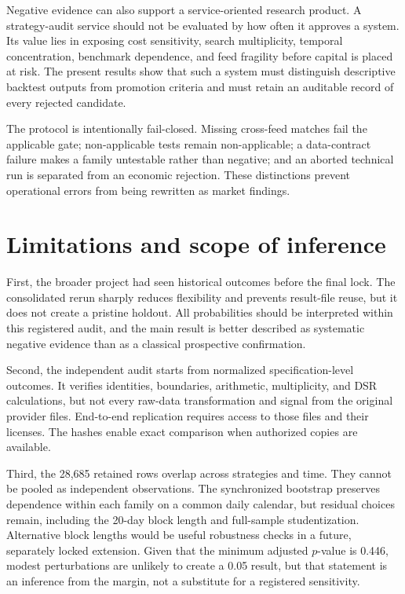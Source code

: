 Negative evidence can also support a service-oriented research product. A strategy-audit service should not be evaluated by how often it approves a system. Its value lies in exposing cost sensitivity, search multiplicity, temporal concentration, benchmark dependence, and feed fragility before capital is placed at risk. The present results show that such a system must distinguish descriptive backtest outputs from promotion criteria and must retain an auditable record of every rejected candidate.

The protocol is intentionally fail-closed. Missing cross-feed matches fail the applicable gate; non-applicable tests remain non-applicable; a data-contract failure makes a family untestable rather than negative; and an aborted technical run is separated from an economic rejection. These distinctions prevent operational errors from being rewritten as market findings.

\section{Limitations and scope of inference}\label{sec:limitations}

First, the broader project had seen historical outcomes before the final lock. The consolidated rerun sharply reduces flexibility and prevents result-file reuse, but it does not create a pristine holdout. All probabilities should be interpreted within this registered audit, and the main result is better described as systematic negative evidence than as a classical prospective confirmation.

Second, the independent audit starts from normalized specification-level outcomes. It verifies identities, boundaries, arithmetic, multiplicity, and DSR calculations, but not every raw-data transformation and signal from the original provider files. End-to-end replication requires access to those files and their licenses. The hashes enable exact comparison when authorized copies are available.

Third, the 28,685 retained rows overlap across strategies and time. They cannot be pooled as independent observations. The synchronized bootstrap preserves dependence within each family on a common daily calendar, but residual choices remain, including the 20-day block length and full-sample studentization. Alternative block lengths would be useful robustness checks in a future, separately locked extension. Given that the minimum adjusted $p$-value is 0.446, modest perturbations are unlikely to create a 0.05 result, but that statement is an inference from the margin, not a substitute for a registered sensitivity.

